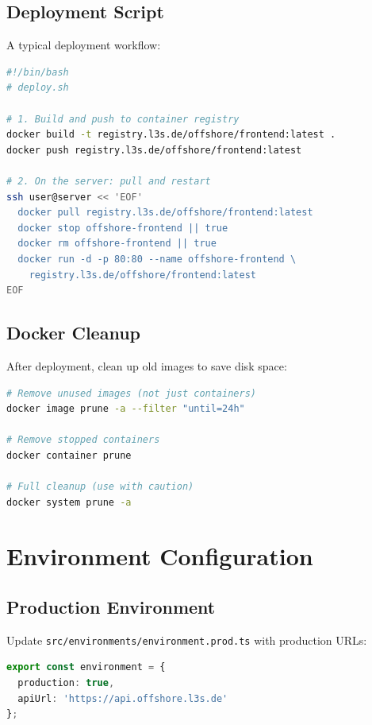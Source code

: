 \subsection{Deployment Script}

A typical deployment workflow:

\begin{lstlisting}[language=bash, caption={Production deployment script}]
#!/bin/bash
# deploy.sh

# 1. Build and push to container registry
docker build -t registry.l3s.de/offshore/frontend:latest .
docker push registry.l3s.de/offshore/frontend:latest

# 2. On the server: pull and restart
ssh user@server << 'EOF'
  docker pull registry.l3s.de/offshore/frontend:latest
  docker stop offshore-frontend || true
  docker rm offshore-frontend || true
  docker run -d -p 80:80 --name offshore-frontend \
    registry.l3s.de/offshore/frontend:latest
EOF
\end{lstlisting}

\subsection{Docker Cleanup}

After deployment, clean up old images to save disk space:

\begin{lstlisting}[language=bash, caption={Docker cleanup commands}]
# Remove unused images (not just containers)
docker image prune -a --filter "until=24h"

# Remove stopped containers
docker container prune

# Full cleanup (use with caution)
docker system prune -a
\end{lstlisting}

\section{Environment Configuration}
\label{sec:environment-configuration}

\subsection{Production Environment}

Update \texttt{src/environments/environment.prod.ts} with production URLs:

\begin{lstlisting}[language=TypeScript, caption={Production environment configuration}]
export const environment = {
  production: true,
  apiUrl: 'https://api.offshore.l3s.de'
};
\end{lstlisting}

